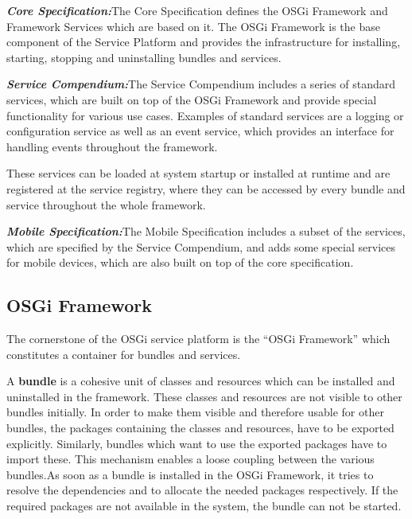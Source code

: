 \noindent\textbf{\textit{Core Specification:}}\newline The Core Specification
defines the OSGi Framework and Framework Services which are based on it. The OSGi
Framework is the base component of the Service Platform and provides the
infrastructure for installing, starting, stopping and uninstalling bundles and
services.

\noindent\textbf{\textit{Service Compendium:}}\newline The Service Compendium
includes a series of standard services, which are built on top of the OSGi
Framework and provide special functionality for various use cases. Examples of
standard services are a logging or configuration service as well as an event
service, which provides an interface for handling events throughout the
framework.

These services can be loaded at system startup or installed at runtime and are
registered at the service registry, where they can be accessed by every bundle
and service throughout the whole framework.

\noindent\textbf{\textit{Mobile Specification:}}\newline The Mobile Specification
includes a subset of the services, which are specified by the Service Compendium,
and adds some special services for mobile devices, which are also built on top of
the core specification.

\subsection{OSGi Framework}
\label{label_osgi_framework}
The cornerstone of the OSGi service platform is the ``OSGi Framework'' which
constitutes a container for bundles and services.

A \textbf{bundle} is a cohesive unit of classes and resources which can be
installed and uninstalled in the framework. These classes and resources are not
visible to other bundles initially. In order to make them visible and therefore
usable for other bundles, the packages containing the classes and resources, have
to be exported explicitly. Similarly, bundles which want to use the exported
packages have to import these. This mechanism enables a loose coupling between
the various bundles.\newline As soon as a bundle is installed in the OSGi
Framework, it tries to resolve the dependencies and to allocate the needed
packages respectively. If the required packages are not available in the system,
the bundle can not be started.

